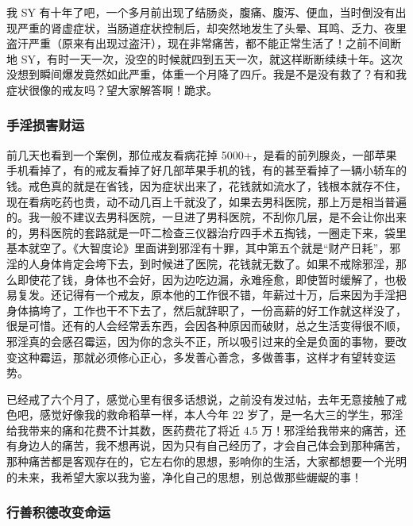 \begin{case}[手淫损害健康运]
    我 SY 有十年了吧，一个多月前出现了结肠炎，腹痛、腹泻、便血，当时倒没有出现严重的肾虚症状，当肠道症状控制后，却突然地发生了头晕、耳鸣、乏力、夜里盗汗严重（原来有出现过盗汗），现在非常痛苦，都不能正常生活了！之前不间断地 SY，有时一天一次，没空的时候就四到五天一次，就这样断断续续十年。这次没想到瞬间爆发竟然如此严重，体重一个月降了四斤。我是不是没有救了？有和我症状很像的戒友吗？望大家解答啊！跪求。
\end{case}

\subsubsection{手淫损害财运}

前几天也看到一个案例，那位戒友看病花掉 5000+，是看的前列腺炎，一部苹果手机看掉了，有的戒友看掉了好几部苹果手机的钱，有的甚至看掉了一辆小轿车的钱。戒色真的就是在省钱，因为症状出来了，花钱就如流水了，钱根本就存不住，现在看病吃药也贵，动不动几百上千就没了，如果去男科医院，那上万是相当普遍的。我一般不建议去男科医院，一旦进了男科医院，不刮你几层，是不会让你出来的，男科医院的套路就是一吓二检查三仪器治疗四手术五掏钱，一圈走下来，袋里基本就空了。《大智度论》里面讲到邪淫有十罪，其中第五个就是“财产日耗”，邪淫的人身体肯定会垮下去，到时候进了医院，花钱就无数了。如果不戒除邪淫，那么即使花了钱，身体也不会好，因为边吃边漏，永难痊愈，即使暂时缓解了，也极易复发。还记得有一个戒友，原本他的工作很不错，年薪过十万，后来因为手淫把身体搞垮了，工作也干不下去了，然后就辞职了，一份高薪的好工作就这样没了，很是可惜。还有的人会经常丢东西，会因各种原因而破财，总之生活变得很不顺，邪淫真的会感召霉运，因为你的念头不正，所以吸引过来的全是负面的事物，要改变这种霉运，那就必须修心正心，多发善心善念，多做善事，这样才有望转变运势。

\begin{case}[手淫损害财运]
    已经戒了六个月了，感觉心里有很多话想说，之前没有发过帖，去年无意接触了戒色吧，感觉好像我的救命稻草一样，本人今年 22 岁了，是一名大三的学生，邪淫给我带来的痛和花费不计其数，医药费花了将近 4.5 万！邪淫给我带来的痛苦，还有身边人的痛苦，我不想再说，因为只有自己经历了，才会自己体会到那种痛苦，那种痛苦都是客观存在的，它左右你的思想，影响你的生活，大家都想要一个光明的未来，我希望大家以我为鉴，净化自己的思想，别总做那些龌龊的事！
\end{case}

\subsubsection{行善积德改变命运}

